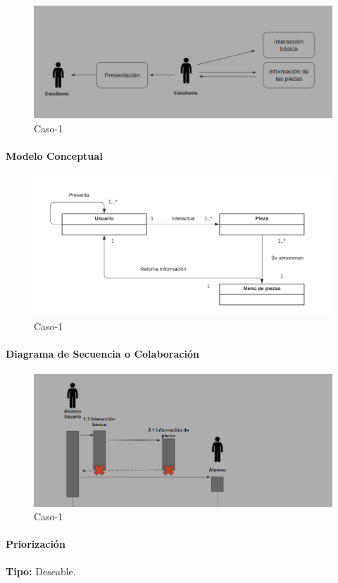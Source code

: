 \begin{figure}[H]
\centerline{\includegraphics[width=15cm]{imgs/CasoUso_4.PNG}}
\caption{Caso-1}
\label{fig}
\end{figure}

\paragraph{Modelo Conceptual}

\begin{figure}[H]
\centerline{\includegraphics[width=15cm]{imgs/ModeloConceptualCaso_4_3.png}}
\caption{Caso-1}
\label{fig}
\end{figure}


\paragraph{Diagrama de Secuencia o Colaboración}

\begin{figure}[H]
\centerline{\includegraphics[width=15cm]{imgs/CasoUso_4_2.PNG}}
\caption{Caso-1}
\label{fig}
\end{figure}

\paragraph{Priorización}
{\textbf {Tipo:}}
Deseable.